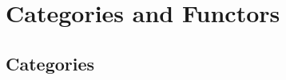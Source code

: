 \documentclass[main.tex]{subfiles}
\begin{document}
\chapter{Categories and Functors}\label{chap:catfunc}
\section{Categories}
\end{document}
